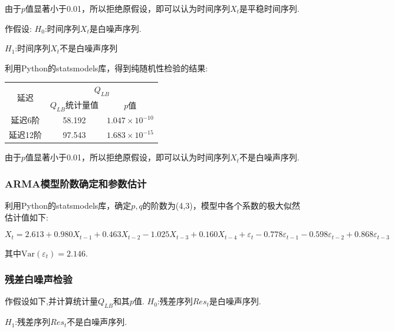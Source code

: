 \documentclass{ctexart}
\begin{document}
由于$p$值显著小于0.01，所以拒绝原假设，即可以认为时间序列$X_{t}$是平稳时间序列.


作假设:
\newline
\indent\indent $H_{0}$:时间序列$X_{t}$是白噪声序列.

\indent\indent$H_{1}$:时间序列$X_{t}$不是白噪声序列

利用Python的statsmodels库，得到纯随机性检验的结果:
\begin{table}[!h]\center
\begin{tabular}{|c|c|c|}
\hline
\multirow{2}{*}{延迟}&\multicolumn{2}{|c|}{$Q_{LB}$}\\
\cline{2-3}
&$Q_{LB}$统计量值&$p$值\\
\hline
延迟6阶              &          58.192 &                  $ 1.047\times 10^{-10}$\\
\hline

延迟12阶              &              97.543         &      $ 1.683\times 10^{-15}$\\
\hline
\end{tabular}
\end{table}

由于$p$值显著小于0.01，所以拒绝原假设，即可以认为时间序列$X_{t}$不是白噪声序列.

\subsubsection{ARMA模型阶数确定和参数估计}

利用Python的statsmodels库，确定$p,q$的阶数为(4,3)，模型中各个系数的极大似然估计值如下:
\begin{footnotesize}
$$X_{t}=2.613+0.980X_{t-1}+0.463X_{t-2}-1.025X_{t-3}+0.160X_{t-4}+\varepsilon_{t}-0.778\varepsilon_{t-1}-0.598\varepsilon_{t-2}+0.868\varepsilon_{t-3}$$
\end{footnotesize}
其中$\mathrm{Var}(\varepsilon_{t})=2.146$.

\subsubsection{残差白噪声检验}

作假设如下,并计算统计量$Q_{LB}$和其$p$值.
\newline
\indent\indent $H_{0}$:残差序列$Res_{t}$是白噪声序列.

\indent\indent$H_{1}$:残差序列$Res_{t}$不是白噪声序列.
\end{document}
